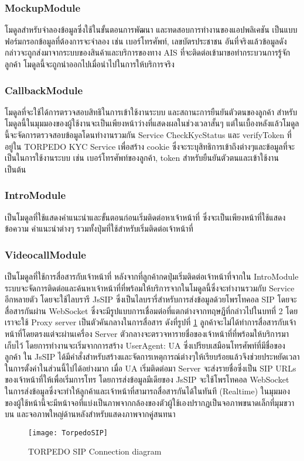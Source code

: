 	\setcounter{secnumdepth}{4} 
	\subsubsection{MockupModule}
		โมดูลสำหรับจำลองข้อมูลซึ่งใช้ในขั้นตอนการพัฒนา และทดสอบการทำงานของแอปพลิเคชัน เป็นแบบฟอร์มกรอกข้อมูลที่ต้องการจะจำลอง เช่น เบอร์โทรศัพท์, เลขบัตรประชาชน อันที่จริงแล้วข้อมูลดังกล่าวจะถูกส่งมาจากระบบของสินค้าและบริการของทาง AIS ที่จะติดต่อเข้ามาขอทำกระบวนการรู้จักลูกค้า โมดูลนี้จะถูกนำออกไปเมื่อนำไปในการให้บริการจริง
	\subsubsection{CallbackModule}
		โมดูลที่จะใช้ได้การตรวจสอบสิทธิในการเข้าใช้งานระบบ และสถานะการยืนยันตัวตนของลูกค้า สำหรับโมดูลนี้ในมุมมองของผู้ใช้งานจะเป็นเพียงหน้าว่างที่แสดงผลในช่วงเวลาสั้นๆ แต่ในเบื้องหลังแล้วโมดูลนี้จะจัดการตรวจสอบข้อมูลโดนทำงานรวมกัน Service CheckKycStatus และ verifyToken ที่อยู่ใน TORPEDO KYC Service เพื่อสร้าง cookie ซึ่งจะระบุสิทธิการเข้าถึงต่างๆและข้อมูลที่จะเป็นในการใช้งานระบบ เช่น เบอร์โทรศัพท์ของลูกค้า, token สำหรับยืนยันตัวตนและเข้าใช้งาน เป็นต้น 
	\subsubsection{IntroModule}
	 เป็นโมดูลที่ใช้แสดงคำแนะนำและขั้นตอนก่อนเริ่มติดต่อหาเจ้าหน้าที่ ซึ่งจะเป็นเพียงหน้าที่ใช้แสดงข้อความ คำแนะนำต่างๆ รวมทั้งปุ่มที่ใช้สำหรับเริ่มติดต่อเจ้าหน้าที่
	 \subsubsection{VideocallModule}
	 เป็นโมดูลที่ใช้การสื่อสารกับเจ้าหน้าที่ หลังจากที่ลูกค้ากดปุ่มเริ่มติดต่อเจ้าหน้าที่จากใน IntroModule ระบบจะจัดการติดต่อและค้นหาเจ้าหน้าที่ที่พร้อมให้บริการจากในโมดูลนี้ซึ่งจะทำงานรวมกับ Service อีกหลายตัว โดยจะใช้ไลบรารี JsSIP ซึ่งเป็นไลบรารี่สำหรับการส่งข้อมูลด้วยโพรโทคอล SIP โดยจะสื่อสารกันผ่าน WebSocket ซึ่งจะมีรูปแบบการเชื่อมต่อที่แตกต่างจากทฤษฏีที่กล่าวไปในบทที่ 2 โดยเราจะใช้ Proxy server เป็นตัวคันกลางในการสื่อสาร ดังที่รูปที่ \ref{Fig:torpedoSIP} ลูกค้าจะไม่ได้ทำการสื่อสารกับเจ้าหน้าที่โดยตรงแต่จะผ่านเครื่อง Server ตัวกลางจะตรวจหารายชื่อของเจ้าหน้าที่ที่พร้อมให้บริการมาเก็บไว้ โดยการทำงานจะเริ่มจากการสร้าง UserAgent: UA ซึ่งเปรียบเสมือนโทรศัพท์ที่มีชื่อของลูกค้า ใน JsSIP ได้มีคำสั่งสำหรับสร้างและจัดการเหตุการณ์ต่างๆให้เรียบร้อยแล้วจึงช่วยประหยัดเวลาในการตั้งค่าในส่วนนี้ไปได้อย่างมาก เมื่อ UA เริ่มติดต่อมา Server จะส่งรายชื่อซึ่งเป็น SIP URLs ของเจ้าหน้าที่ให้เพื่อเริ่มการโทร โดยการส่งข้อมูลมีเดียของ JsSIP จะใช้โพรโทคอล WebSocket ในการส่งข้อมูลซึ่งจะทำให้ลูกค้าและเจ้าหน้าที่สามารถสื่อสารกันได้ในทันที (Realtime)
	 ในมุมมองของผู้ใช้หน้านี้จะมีหน้าจอที่แบ่งเป็นภาพจากกล้องของตัวผู้ใช้เองปรากฏเป็นจอภาพขนาดเล็กที่มุมขวาบน และจอภาพใหญ่ด้านหลังสำหรับแสดงภาพจากคู่สนทนา
	 \begin{figure}[h]
	 	\centering
	 	\texttt{[image: TorpedoSIP]}
	 	\caption{TORPEDO SIP Connection diagram}
	 	\label{Fig:torpedoSIP}
	 \end{figure}
